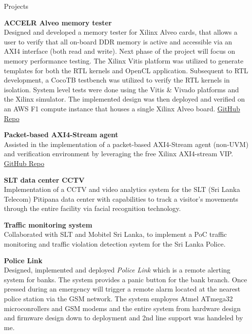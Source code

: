 \documentclass[
	11pt, %
]{./../assets/resume} %
\begin{document}
\begin{rSection}{Projects}

	\textbf{ACCELR Alveo memory tester} \\
	Designed and developed a memory tester for Xilinx Alveo cards, that allows a user to verify that all on-board DDR memory is active and accessible via an AXI4 interface (both read and write). Next phase of the project will focus on memory performance testing. The Xilinx Vitis platform was utilized to generate templates for both the RTL kernels and OpenCL application. Subsequent to RTL development, a CocoTB testbench was utilized to verify the RTL kernels in isolation. System level tests were done using the Vitis \& Vivado platforms and the Xilinx simulator. The implemented design was then deployed and verified on an AWS F1 compute instance that houses a single Xilinx Alveo board. \href{https://github.com/accelr-net/alveo-memory-tester}{GitHub Repo}

	\textbf{Packet-based AXI4-Stream agent} \\
	Assisted in the implementation of a packet-based AXI4-Stream agent (non-UVM) and verification environment by leveraging the free Xilinx AXI4-stream VIP. \href{https://github.com/accelr-net/axis_fifo_unit_test}{GitHub Repo}

	\textbf{SLT data center CCTV} \\
	Implementation of a CCTV and video analytics system for the SLT (Sri Lanka Telecom) Pitipana data center with capabilities to track a visitor's movements through the entire facility via facial recognition technology.

	\textbf{Traffic monitoring system} \\
	Collaborated with SLT and Mobitel Sri Lanka, to implement a PoC traffic monitoring and traffic violation detection system for the Sri Lanka Police.

	\textbf{Police Link} \\
	Designed, implemented and deployed \emph{Police Link} which is a remote alerting system for banks. The system provides a panic button for the bank branch. Once pressed during an emergency will trigger a remote alarm located at the nearest police station via the GSM network. The system employes Atmel ATmega32 microconrollers and GSM modems and the entire system from hardware design and firmware design down to deployment and 2nd line support was handeled by me.

\end{rSection}
\end{document}
